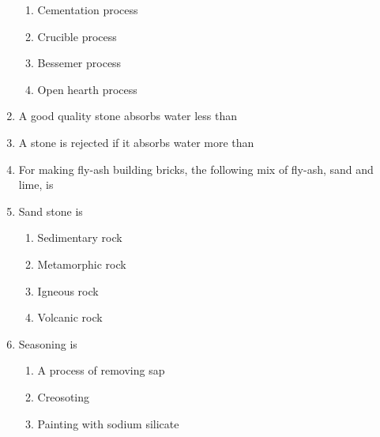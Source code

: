 \documentclass[11pt,a4paper]{article}
\begin{document}
\begin{enumerate}
\begin{enumerate}[label=\Alph*.]
\item{Cementation process}
\item{Crucible process}
\item{Bessemer process}
\item{Open hearth process}
\end{enumerate}
\item{A good quality stone absorbs water less than}
\\
\item{A stone is rejected if it absorbs water more than}
\\
\item{For making fly-ash building bricks, the following mix of fly-ash, sand and lime, is}
\\
\item{Sand stone is}
\begin{enumerate}[label=\Alph*.]
\item{Sedimentary rock}
\item{Metamorphic rock}
\item{Igneous rock}
\item{Volcanic rock}
\end{enumerate}
\item{Seasoning is}
\begin{enumerate}[label=\Alph*.]
\item{A process of removing sap}
\item{Creosoting}
\item{Painting with sodium silicate}

\end{enumerate}
\end{enumerate}
\end{document}
